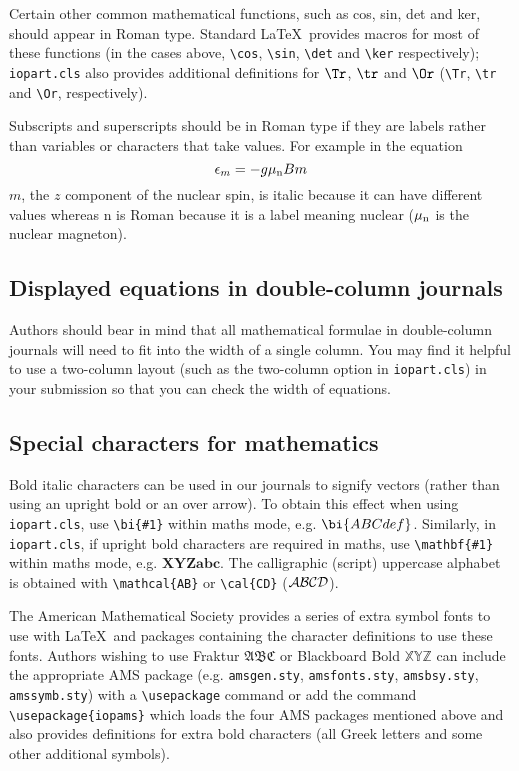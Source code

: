 \documentclass[12pt]{iopart}
\begin{document}
Certain other common mathematical functions, such as cos, sin, det and 
ker, should appear in Roman type. Standard \LaTeX\ provides macros for 
most of these functions 
(in the cases above, \verb"\cos", \verb"\sin", \verb"\det" and \verb"\ker" 
respectively); \verb"iopart.cls" also provides 
additional definitions for $\Tr$, $\tr$ and 
$\Or$ (\verb"\Tr", \verb"\tr" and \verb"\Or", respectively). 

Subscripts and superscripts should be in Roman type if they are labels 
rather than variables or characters that take values. For example in the 
equation
\[
\epsilon_m=-g\mu_{\rm n}Bm
\]
$m$, the $z$ component of the nuclear spin, is italic because it can have 
different values whereas n is Roman because it 
is a label meaning nuclear ($\mu_{\rm n}$ 
is the nuclear magneton).


\subsection{Displayed equations in double-column journals}
Authors should bear in mind that all mathematical formulae in double-column journals will need to fit
into the width of a single column.  You may find it helpful to use a two-column layout (such as the two-column
option in \verb"iopart.cls") in your submission so that you can check the width of equations.

\subsection{Special characters for mathematics}
Bold italic characters can be used in our journals to signify vectors (rather
than using an upright bold or an over arrow). To obtain this effect when using \verb"iopart.cls",
use \verb"\bi{#1}" within maths mode, e.g. $\bi{ABCdef}$. Similarly, in \verb"iopart.cls", if upright 
bold characters are required in maths, use \verb"\mathbf{#1}" within maths
mode, e.g. $\mathbf{XYZabc}$. The calligraphic (script) uppercase alphabet
is obtained with \verb"\mathcal{AB}" or \verb"\cal{CD}" 
($\mathcal{AB}\cal{CD}$).

The American Mathematical Society provides a series of extra symbol fonts
to use with \LaTeX\ and packages containing the character definitions to
use these fonts. Authors wishing to use Fraktur 
\ifiopams$\mathfrak{ABC}$ \fi
or Blackboard Bold \ifiopams$\mathbb{XYZ}$ \fi can include the appropriate
AMS package (e.g. \verb"amsgen.sty", \verb"amsfonts.sty", \verb"amsbsy.sty", \verb"amssymb.sty") with a 
\verb"\usepackage" command or add the command \verb"\usepackage{iopams}"
which loads the four AMS packages mentioned above and also provides
definitions for extra bold characters (all Greek letters and some other
additional symbols). 
\end{document}
